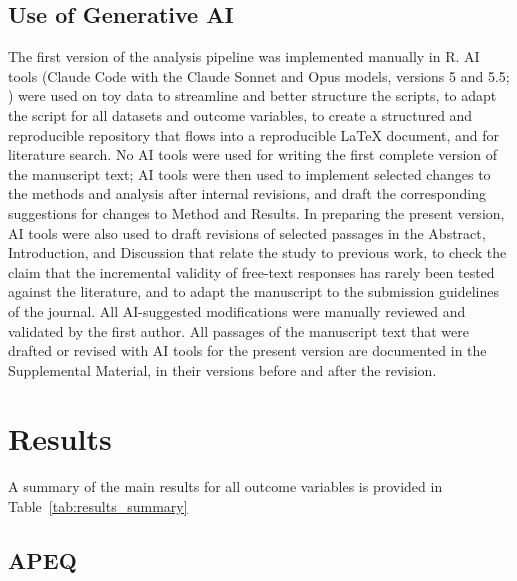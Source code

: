\documentclass[man,floatsintext]{apa7}
\newcommand{\change}[1]{#1}
\begin{document}
\subsection{Use of Generative AI}

The first version of the analysis pipeline was implemented manually in R. AI tools (Claude Code with the Claude Sonnet and Opus models, versions 5 and 5.5; \cite{anthropic2026claude}) were used on toy data to streamline and better structure the scripts, to adapt the script for all datasets and outcome variables, \change{to create a structured and reproducible repository that flows into a reproducible \LaTeX{} document,} and for literature search. No AI tools were used for writing the first complete version of the manuscript text; \change{AI tools were then used to implement selected changes to the methods and analysis after internal revisions, and draft the corresponding suggestions for changes to Method and Results}. \change{In preparing the present version, AI tools were also used to draft revisions of selected passages in the Abstract, Introduction, and Discussion that relate the study to previous work, to check the claim that the incremental validity of free-text responses has rarely been tested against the literature, and to adapt the manuscript to the submission guidelines of the journal.} \change{All AI-suggested modifications were manually reviewed and validated by the first author.} \change{All passages of the manuscript text that were drafted or revised with AI tools for the present version are documented in the Supplemental Material, in their versions before and after the revision.}

\section{Results}

A summary of the main results for all outcome variables is provided in Table~\ref{tab:results_summary}

\subsection{APEQ}
\end{document}

